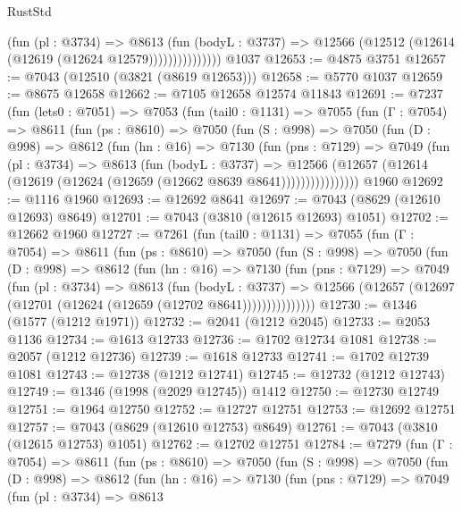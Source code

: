 \begin{lexlean}{RustStd}
\begin{coremodule}
                      (fun (pl : @3734) =>
                      @8613
                        (fun (bodyL : @3737) =>
                        @12566 (@12512 (@12614 (@12619 (@12624 @12579)))))))))))))))
    @1037
@12653 := @4875 @3751
@12657 := @7043 (@12510 (@3821 (@8619 @12653)))
@12658 := @5770 @1037
@12659 := @8675 @12658
@12662 := @7105 @12658 @12574 @11843
@12691 := @7237
    (fun (lets0 : @7051) =>
    @7053
      (fun (tail0 : @1131) =>
      @7055
        (fun (Γ : @7054) =>
        @8611
          (fun (ps : @8610) =>
          @7050
            (fun (S : @998) =>
            @7050
              (fun (D : @998) =>
              @8612
                (fun (hn : @16) =>
                @7130
                  (fun (pns : @7129) =>
                  @7049
                    (fun (pl : @3734) =>
                    @8613
                      (fun (bodyL : @3737) =>
                      @12566
                        (@12657 (@12614 (@12619 (@12624 (@12659 (@12662 @8639 @8641))))))))))))))))
    @1960
@12692 := @1116 @1960
@12693 := @12692 @8641
@12697 := @7043 (@8629 (@12610 @12693) @8649)
@12701 := @7043 (@3810 (@12615 @12693) @1051)
@12702 := @12662 @1960
@12727 := @7261
    (fun (tail0 : @1131) =>
    @7055
      (fun (Γ : @7054) =>
      @8611
        (fun (ps : @8610) =>
        @7050
          (fun (S : @998) =>
          @7050
            (fun (D : @998) =>
            @8612
              (fun (hn : @16) =>
              @7130
                (fun (pns : @7129) =>
                @7049
                  (fun (pl : @3734) =>
                  @8613
                    (fun (bodyL : @3737) =>
                    @12566 (@12657 (@12697 (@12701 (@12624 (@12659 (@12702 @8641)))))))))))))))
@12730 := @1346 (@1577 (@1212 @1971))
@12732 := @2041 (@1212 @2045)
@12733 := @2053 @1136
@12734 := @1613 @12733
@12736 := @1702 @12734 @1081
@12738 := @2057 (@1212 @12736)
@12739 := @1618 @12733
@12741 := @1702 @12739 @1081
@12743 := @12738 (@1212 @12741)
@12745 := @12732 (@1212 @12743)
@12749 := @1346 (@1998 (@2029 @12745)) @1412
@12750 := @12730 @12749
@12751 := @1964 @12750
@12752 := @12727 @12751
@12753 := @12692 @12751
@12757 := @7043 (@8629 (@12610 @12753) @8649)
@12761 := @7043 (@3810 (@12615 @12753) @1051)
@12762 := @12702 @12751
@12784 := @7279
    (fun (Γ : @7054) =>
    @8611
      (fun (ps : @8610) =>
      @7050
        (fun (S : @998) =>
        @7050
          (fun (D : @998) =>
          @8612
            (fun (hn : @16) =>
            @7130
              (fun (pns : @7129) =>
              @7049
                (fun (pl : @3734) =>
                @8613

\end{coremodule}
\end{lexlean}
